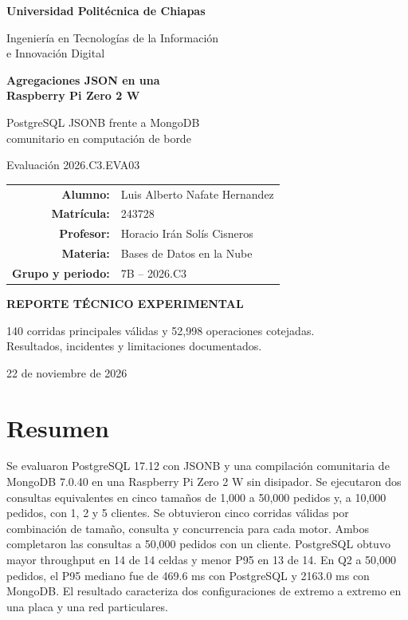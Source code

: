 \documentclass[10pt,a4paper]{article}
\begin{document}
\begin{titlepage}
\thispagestyle{empty}
\centering
\setlength{\parskip}{0pt}
\color{black}
\vspace*{4mm}
{\Large\textbf{Universidad Politécnica de Chiapas}\par}
\vspace{6mm}
{\large Ingeniería en Tecnologías de la Información\\e Innovación Digital\par}
\vspace{22mm}
{\fontsize{25}{30}\selectfont\bfseries\color{azul} Agregaciones JSON en una\\Raspberry Pi Zero 2 W\par}
\vspace{7mm}
{\Large PostgreSQL JSONB frente a MongoDB\\comunitario en computación de borde\par}
\vspace{13mm}
{\large Evaluación 2026.C3.EVA03\par}
\vspace{14mm}
{\renewcommand{\arraystretch}{1.35}
\begin{tabular}{@{}r@{\quad}l@{}}
\textbf{Alumno:} & Luis Alberto Nafate Hernandez\\
\textbf{Matrícula:} & 243728\\
\textbf{Profesor:} & Horacio Irán Solís Cisneros\\
\textbf{Materia:} & Bases de Datos en la Nube\\
\textbf{Grupo y periodo:} & 7B -- 2026.C3\\
\end{tabular}
\par}
\vfill
{\large\textbf{REPORTE TÉCNICO EXPERIMENTAL}\par}
\vspace{4mm}
{\small 140 corridas principales válidas y 52,998 operaciones cotejadas.\\Resultados, incidentes y limitaciones documentados.\par}
\vspace{7mm}
22 de noviembre de 2026\par
\vspace*{3mm}
\end{titlepage}
\setcounter{page}{2}

\section*{Resumen}
Se evaluaron PostgreSQL 17.12 con JSONB y una compilación comunitaria de MongoDB 7.0.40 en una Raspberry Pi Zero 2 W sin disipador. Se ejecutaron dos consultas equivalentes en cinco tamaños de 1,000 a 50,000 pedidos y, a 10,000 pedidos, con 1, 2 y 5 clientes. Se obtuvieron cinco corridas válidas por combinación de tamaño, consulta y concurrencia para cada motor. Ambos completaron las consultas a 50,000 pedidos con un cliente. PostgreSQL obtuvo mayor throughput en 14 de 14 celdas y menor P95 en 13 de 14. En Q2 a 50,000 pedidos, el P95 mediano fue de 469.6 ms con PostgreSQL y 2163.0 ms con MongoDB. El resultado caracteriza dos configuraciones de extremo a extremo en una placa y una red particulares.
\end{document}
